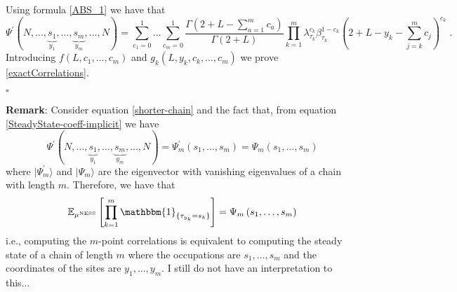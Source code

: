 \documentclass[10pt]{article}
\numberwithin{equation}{section}
\numberwithin{equation}{subsection}
\newcommand{\dt}{\;.}
\begin{document}
Using formula \eqref{ABS_1} we have that 
\begin{equation}
 \Psi^{'}(N,\ldots,\underbrace{s_{1}}_{y_{1}},\ldots,\underbrace{s_{m}}_{y_{m}},\ldots,N)=\sum_{c_{1}=0}^{1}\ldots\sum_{c_{m}=0}^{1}\frac{\Gamma(2+L-\sum_{a=1}^{m}c_{a})}{\Gamma(2+L)}\prod_{k=1}^{m}\lambda_{\tau_{k}}^{c_{k}}\beta_{\tau_{k}}^{1-c_{k}}\left(2+L-y_{k}-\sum_{j=k}^{m}c_{j}\right)^{c_{k}}\dt
\end{equation}
Introducing $f(L,c_{1},\ldots,c_{m})$ and $g_{k}(L,y_{k},c_{k},\ldots,c_{m})$ we prove \eqref{exactCorrelations}.
\begin{flushright}
	$\square$
\end{flushright}
{\color{blue}
\textbf{Remark}: Consider equation \eqref{shorter-chain} and the fact that, from equation \eqref{SteadyState-coeff-implicit} we have  
\begin{equation}
\Psi^{'}(N,\ldots,\underbrace{s_{1}}_{y_{1}},\ldots,\underbrace{s_{m}}_{y_{m}},\ldots,N)=\Psi_{m}^{'}\left(s_{1},\ldots,s_{m}\right)=\Psi_{m}\left(s_{1},\ldots,s_{m}\right)
\end{equation}
where $|\Psi_{m}^{'}\rangle$ and $|\Psi_{m}\rangle$ are the eigenvector with vanishing eigenvalues of a chain with length $m$. Therefore, we have that 
\begin{equation}
\mathbb{E}_{\mu^{\text{NESS}}}\left[\prod_{k=1}^{m}\mathbbm{1}_{\{\tau_{y_{k}}=s_{k}\}}\right]=\Psi_{m}\left(s_{1},\ldots,s_{m}\right)
\end{equation}
i.e., computing the $m$-point correlations is equivalent to computing the steady state of a chain of length $m$ where the occupations are $s_{1},\ldots,s_{m}$ and the coordinates of the sites are $y_{1},\ldots,y_{m}$. I still do not have an interpretation to this...
}
\end{document}
